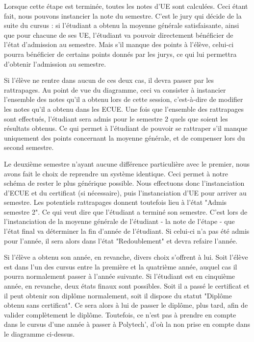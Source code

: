\documentclass[letter, 11pt] {article}
\begin{document}
	Lorsque cette étape est terminée, toutes les notes d'UE sont calculées. Ceci étant fait, nous pouvons instancier la note du semestre.
	C'est le jury qui décide de la suite du cursus : si l'étudiant a obtenu la moyenne générale satisfaisante, ainsi que pour chacune de ses UE, l'étudiant va pouvoir directement bénéficier de l'état d'admission au semestre.
	Mais s'il manque des points à l'élève, celui-ci pourra bénéficier de certains points donnés par les jurys, ce qui lui permettra d'obtenir l'admission au semestre.

	Si l'élève ne rentre dans aucun de ces deux cas, il devra passer par les rattrapages. Au point de vue du diagramme, ceci va consister à instancier l'ensemble des notes qu'il a obtenu lors de cette session, c'est-à-dire de modifier les notes qu'il a obtenu dans les ECUE. Une fois que l'ensemble des rattrapages sont effectués, l'étudiant sera admis pour le semestre 2 quels que soient les résultats obtenus. Ce qui permet à l'étudiant de pouvoir se rattraper s'il manque uniquement des points concernant la moyenne générale, et de compenser lors du second semestre.

	Le deuxième semestre n'ayant aucune différence particulière avec le premier, nous avons fait le choix de reprendre un système identique. Ceci permet à notre schéma de rester le plus générique possible. Nous effectuons donc l'instanciation d'ECUE et du certificat (si nécessaire), puis l'instanciation d'UE pour arriver au semestre. Les potentiels rattrapages donnent toutefois lieu à l'état "Admis semestre 2". Ce qui veut dire que l'étudiant a terminé son semestre. C'est lors de l'instanciation de la moyenne générale de l'étudiant - la note de l'étape - que l'état final va déterminer la fin d'année de l'étudiant.
	Si celui-ci n'a pas été admis pour l'année, il sera alors dans l'état "Redoublement" et devra refaire l'année.
	
	Si l'élève a obtenu son année, en revanche, divers choix s'offrent à lui. Soit l'élève est dans l'un des cursus entre la première et la quatrième année, auquel cas il pourra normalement passer à l'année suivante.
	Si l'étudiant est en cinquième année, en revanche, deux états finaux sont possibles. Soit il a passé le certificat et il peut obtenir son diplôme normalement, soit il dispose du statut "Diplôme obtenu sans certificat". Ce sera alors à lui de passer le diplôme, plus tard, afin de valider complètement le diplôme. Toutefois, ce n'est pas à prendre en compte dans le cursus d'une année à passer à Polytech', d'où la non prise en compte dans le diagramme ci-dessus.
\end{document}
